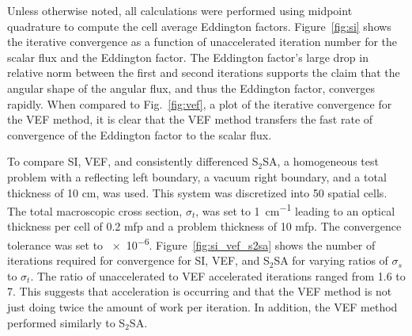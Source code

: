  Unless otherwise noted, all calculations were performed using midpoint quadrature 
to compute the cell average Eddington factors.  Figure~\ref{fig:si} shows the iterative convergence as a function of unaccelerated iteration number for the scalar flux and the Eddington factor. The Eddington factor's large drop in relative norm  between the first and second iterations supports the claim that the angular shape of the angular flux, and thus the Eddington factor, converges rapidly. When compared to Fig.~\ref{fig:vef}, a plot of the iterative convergence for the VEF method, it is clear that the VEF method transfers the fast rate of convergence of the Eddington factor to the scalar flux. 



To compare SI, VEF, and consistently differenced S$_2$SA, a homogeneous test problem with a reflecting left boundary, a vacuum right boundary, and a total thickness of 10 cm, was used. This system was discretized into 50 spatial cells.  The total macroscopic 
cross section, $\sigma_t$, was set to \SI{1}{cm^{-1}} leading to an optical thickness per cell of 0.2 mfp and a problem thickness 
of 10 mfp. The convergence tolerance was set to \num{e-6}.   Figure~\ref{fig:si_vef_s2sa} shows the number of iterations required for convergence for SI, VEF, and S$_2$SA for varying ratios of $\sigma_s$ to $\sigma_t$. The ratio of unaccelerated to VEF accelerated iterations ranged from 1.6 to 7. This suggests that acceleration is occurring and that the VEF method is not just doing twice the amount of work per iteration. In addition, the VEF method performed similarly to S$_2$SA. 

